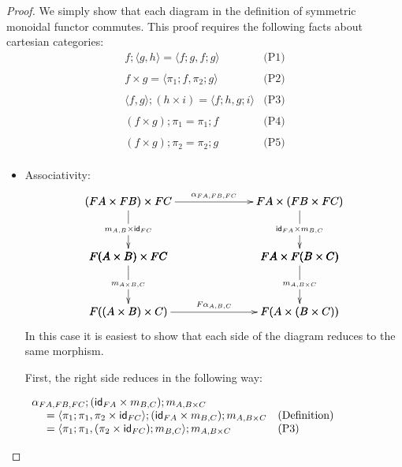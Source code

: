 \begin{proof}
  We simply show that each diagram in the definition of symmetric
  monoidal functor commutes.  This proof requires the following facts
  about cartesian categories:
  \[
  \begin{array}{lll}
    f;\langle g , h \rangle = \langle f;g, f;g \rangle & \text{(P1)}\\
    \\
    f \times g = \langle \pi_1;f , \pi_2;g \rangle & \text{(P2)}\\
    \\
    \langle f , g \rangle;(h \times i) = \langle f;h, g;i \rangle & \text{(P3)}\\
    \\
    (f \times g);\pi_1 = \pi_1;f & \text{(P4)}\\
    \\
    (f \times g);\pi_2 = \pi_2;g & \text{(P5)}\\
  \end{array}
  \]
  \begin{itemize}
  \item[] Associativity:\ \\
    \[
    \bfig
    \vSquares|ammmmma|/->`->`->``->`->`->/[
      (FA \times FB) \times FC`
      FA \times (FB \times FC)`
      F(A \times B) \times FC`
      FA \times F(B \times C)`
      F((A \times B) \times C)`
      F(A \times (B \times C));
      {\alpha}_{FA,FB,FC}`
      m_{A,B} \times \id_{FC}`
      \id_{FA} \times m_{B,C}``
      m_{A \times B,C}`
      m_{A,B \times C}`
      F{\alpha}_{A,B,C}]
    \efig
    \]
    In this case it is easiest to show that each side of the diagram
    reduces to the same morphism.

    First, the right side reduces in the following way:
    \begin{center}
      \begin{math}
        \begin{array}{lll}
          \alpha_{FA,FB,FC};(\mathsf{id}_{FA} \times m_{B,C});m_{A,B \times C} \\
          \,\,\,\,\,\,\,\,= \langle \pi_1;\pi_1, \pi_2 \times \mathsf{id}_{FC} \rangle;(\mathsf{id}_{FA} \times m_{B,C});m_{A,B \times C} & \text{(Definition)}\\
          \,\,\,\,\,\,\,\,= \langle \pi_1;\pi_1, (\pi_2 \times \mathsf{id}_{FC});m_{B,C} \rangle;m_{A,B \times C} & \text{(P3)}\\
        \end{array}
      \end{math}
    \end{center}


\end{itemize}
\end{proof}
